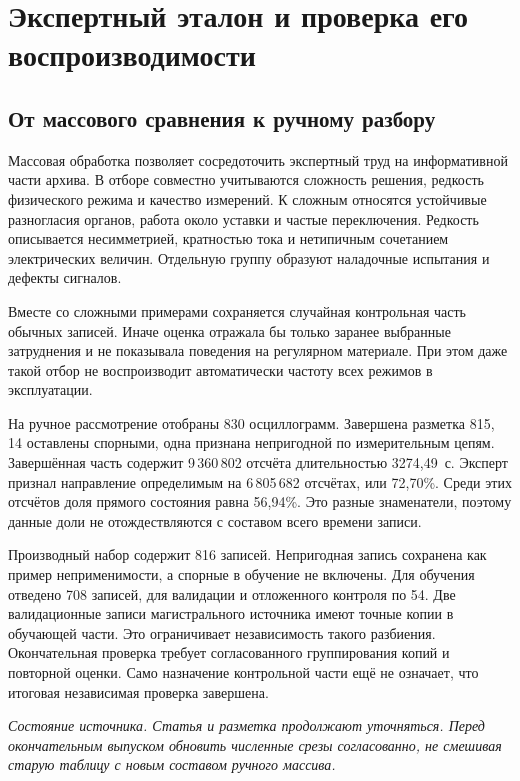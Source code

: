\section{Экспертный эталон и проверка его воспроизводимости}
\label{sec:ch5_expert_reference}

\subsection{От массового сравнения к ручному разбору}

Массовая обработка позволяет сосредоточить экспертный
труд на информативной части архива.
В отборе совместно учитываются сложность решения,
редкость физического режима и качество измерений.
К сложным относятся устойчивые разногласия органов,
работа около уставки и частые переключения.
Редкость описывается несимметрией, кратностью тока
и нетипичным сочетанием электрических величин.
Отдельную группу образуют наладочные испытания и дефекты сигналов.

{}

Вместе со сложными примерами сохраняется случайная
контрольная часть обычных записей.
Иначе оценка отражала бы только заранее выбранные
затруднения и не показывала поведения на регулярном
материале. При этом даже такой отбор не воспроизводит
автоматически частоту всех режимов в эксплуатации.

На ручное рассмотрение отобраны
830 осциллограмм. Завершена разметка 815,
14 оставлены спорными, одна признана непригодной
по измерительным цепям.
Завершённая часть содержит 9\,360\,802 отсчёта
длительностью 3274,49~с.
Эксперт признал направление определимым
на 6\,805\,682 отсчётах, или 72,70\%.
Среди этих отсчётов доля прямого состояния равна 56,94\%.
Это разные знаменатели, поэтому данные доли
не отождествляются с составом всего времени записи.

Производный набор содержит 816 записей.
Непригодная запись сохранена как пример неприменимости,
а спорные в обучение не включены.
Для обучения отведено 708 записей,
для валидации и отложенного контроля по 54.
Две валидационные
записи магистрального источника имеют точные копии
в обучающей части. Это ограничивает независимость
такого разбиения. Окончательная проверка требует
согласованного группирования копий и повторной оценки.
Само назначение контрольной части ещё
не означает, что итоговая независимая проверка завершена.
\ifdefined\AuthorReview
\par\smallskip\textit{Состояние источника. Статья и разметка
продолжают уточняться. Перед окончательным выпуском
обновить численные срезы согласованно, не смешивая
старую таблицу с новым составом ручного массива.}\par
\fi

